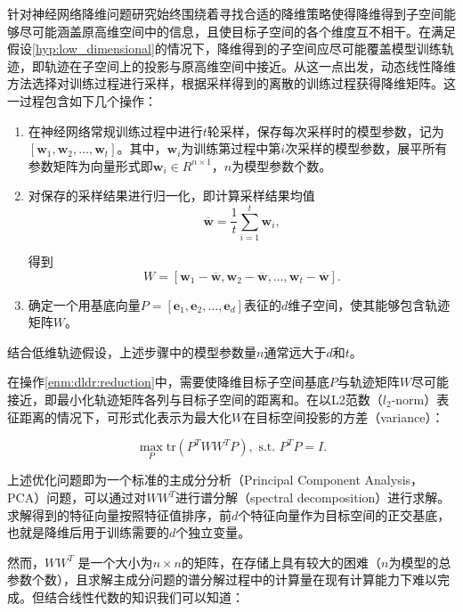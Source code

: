 针对神经网络降维问题研究始终围绕着寻找合适的降维策略使得降维得到子空间能够尽可能涵盖原高维空间中的信息，且使目标子空间的各个维度互不相干。在满足假设\ref{hyp:low_dimensional}的情况下，降维得到的子空间应尽可能覆盖模型训练轨迹，即轨迹在子空间上的投影与原高维空间中接近。从这一点出发，动态线性降维方法选择对训练过程进行采样，根据采样得到的离散的训练过程获得降维矩阵。这一过程包含如下几个操作：
\begin{enumerate} 
    \item 在神经网络常规训练过程中进行$t$轮采样，保存每次采样时的模型参数，记为$[\mathbf{w}_1, \mathbf{w}_2, \dots, \mathbf{w}_t]$。其中，$\mathbf{w}_i$为训练第过程中第$i$次采样的模型参数，展平所有参数矩阵为向量形式即$\mathbf{w}_i \in R^{n\times 1}$，$n$为模型参数个数。
    \item {
        对保存的采样结果进行归一化，即计算采样结果均值
        \begin{equation}
            \overline{\mathbf{w}} = \frac{1}{t}\sum_{i = 1}^t{\mathbf{w}_i},
        \end{equation}
        
        得到
        \begin{equation}
            W = [\mathbf{w}_1 - \overline{\mathbf{w}}, \mathbf{w}_2 - \overline{\mathbf{w}}, \dots, \mathbf{w}_t - \overline{\mathbf{w}}].
        \end{equation}
    }
    \item \label{enm:dldr:reduction}确定一个用基底向量$P = [\mathbf{e}_1, \mathbf{e}_2, \dots, \mathbf{e}_d]$表征的$d$维子空间，使其能够包含轨迹矩阵$W$。
\end{enumerate}

结合低维轨迹假设，上述步骤中的模型参数量$n$通常远大于$d$和$t$。

在操作\ref{enm:dldr:reduction}中，需要使降维目标子空间基底$P$与轨迹矩阵$W$尽可能接近，即最小化轨迹矩阵各列与目标子空间的距离和。在以L2范数（$l_2$-norm）表征距离的情况下，可形式化表示为最大化$W$在目标空间投影的方差（variance）：

\begin{equation}
    \max_{P} \text{tr}\left(P^TWW^TP\right), \text{ s.t. } P^TP=I.
\end{equation}

上述优化问题即为一个标准的主成分分析（Principal Component Analysis，PCA）问题，可以通过对$WW^T$进行谱分解（spectral decomposition）进行求解。求解得到的特征向量按照特征值排序，前$d$个特征向量作为目标空间的正交基底，也就是降维后用于训练需要的$d$个独立变量。

然而，$WW^T$ 是一个大小为$n\times n$的矩阵，在存储上具有较大的困难（$n$为模型的总参数个数），且求解主成分问题的谱分解过程中的计算量在现有计算能力下难以完成。但结合线性代数的知识我们可以知道：

